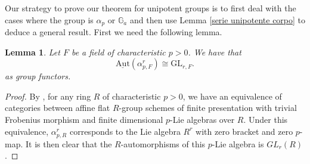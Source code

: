 \documentclass[a4paper,english,12pt]{amsart}
\newtheorem{lemma}[definition]{Lemma}
\numberwithin{equation}{section}
\renewcommand{\_}{\rule{0.25cm}{0.4pt}}
\begin{document}
Our strategy to prove our theorem for unipotent groups is to first deal with the cases where the group is $\alpha_{p}$ or $\mathbb{G}_{a}$ and then use Lemma \ref{serie unipotente corpo} to deduce a general result. First we need the following lemma.

\begin{lemma}\label{auto alpha_{p}}
    Let $F$ be a field of characteristic $p>0$. We have that
    \[
    \underline{\text{Aut}}(\alpha_{p,F}^{r})\cong\text{GL}_{r,F}.
    \]
    as group functors.
\end{lemma}
\begin{proof}
    By \cite[Exp. VII\textsubscript{A}, Remarque 7.5.]{SGA3}, for any ring $R$ of characteristic $p>0$, we have an equivalence of categories between affine flat $R$-group schemes of finite presentation with trivial Frobenius morphism and finite dimensional $p$-Lie algebras over $R$. Under this equivalence, $\alpha_{p,R}^{r}$ corresponds to the Lie algebra $R^{r}$ with zero bracket and zero $p$-map. It is then clear that the $R$-automorphisms of this $p$-Lie algebra is $GL_{r}(R)$.
\end{proof}
\end{document}
